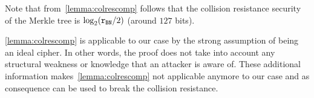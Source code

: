 \begin{remark}
    Note that from~\cref{lemma:colrescomp} follows that the collision resistance security of the \zeth{} Merkle tree is $\log_2(\mathtt{r_{BN}}/2)$ (around $127$ bits).
\end{remark}

\begin{notebox}
   \cref{lemma:colrescomp} is applicable to our case by the strong assumption of \mimcSevenPrime{} being an ideal cipher. In other words, the proof does not take into account any structural weakness or knowledge that an attacker is aware of. These additional information makes~\cref{lemma:colrescomp} not applicable anymore to our case and as consequence can be used to break the collision resistance.
\end{notebox}
